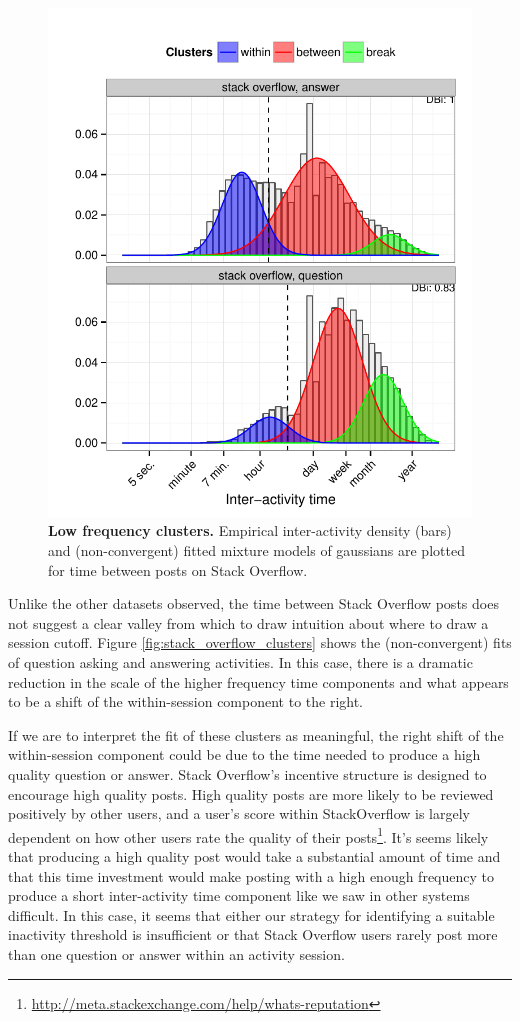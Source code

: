\begin{figure}
\centering
\includegraphics[width=.45\textwidth]{figures/weird_so_clusters.pdf}
\caption{
    \textbf{Low frequency clusters.} Empirical inter-activity density (bars) and (non-convergent) fitted mixture models of gaussians are plotted for time between posts on Stack Overflow.
}
\end{figure}
Unlike the other datasets observed, the time between Stack Overflow posts does not suggest a clear valley from which to draw intuition about where to draw a session cutoff.  Figure \ref{fig:stack_overflow_clusters} shows the (non-convergent) fits of question asking and answering activities.  In this case, there is a dramatic reduction in the scale of the higher frequency time components and what appears to be a shift of the within-session component to the right.

If we are to interpret the fit of these clusters as meaningful, the right shift of the within-session component could be due to the time needed to produce a high quality question or answer.  Stack Overflow's incentive structure is designed to encourage high quality posts.  High quality posts are more likely to be reviewed positively by other users, and a user's score within StackOverflow is largely dependent on how other users rate the quality of their posts\footnote{\url{http://meta.stackexchange.com/help/whats-reputation}}.  It's seems likely that producing a high quality post would take a substantial amount of time and that this time investment would make posting with a high enough frequency to produce a short inter-activity time component like we saw in other systems difficult.  In this case, it seems that either our strategy for identifying a suitable inactivity threshold is insufficient or that Stack Overflow users rarely post more than one question or answer within an activity session.

